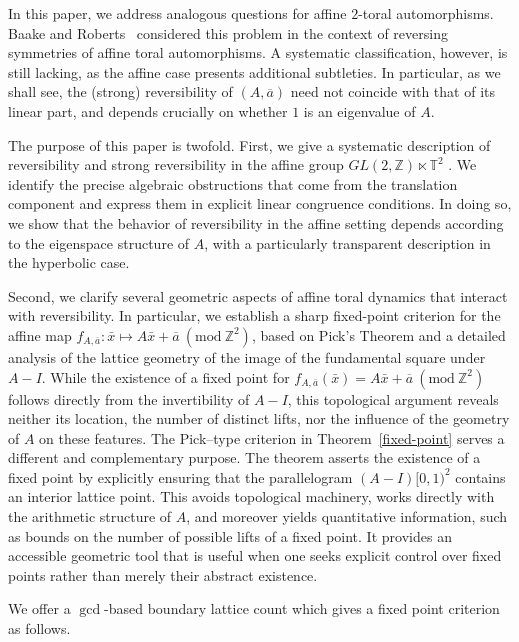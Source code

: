 \documentclass[12pt]{amsart}
\theoremstyle{plain}
\theoremstyle{definition}
\theoremstyle{remark}
\begin{document}
\medskip In this paper, we address analogous questions for affine $2$-toral automorphisms. Baake and Roberts~\cite{BR2} considered this problem in the context of reversing symmetries of affine toral automorphisms. A systematic classification, however, is still lacking, as the affine case presents additional subtleties. In particular, as we shall see, the (strong) reversibility of $(A,\overline{a})$ need not coincide with that of its linear part, and depends crucially on whether $1$ is an eigenvalue of $A$.

\medskip  The purpose of this paper is twofold.  First, we give a systematic description
of reversibility and strong reversibility in the affine group
$ GL(2,\mathbb Z)\ltimes\mathbb T^{2}$ .  We identify the precise algebraic
obstructions that come from the translation component and express them in explicit
linear congruence conditions.  In doing so, we show that the behavior of reversibility in the affine setting depends according to the eigenspace structure of $ A$, with a particularly transparent description in the hyperbolic case.

 Second, we clarify several geometric aspects of affine toral dynamics that
interact with reversibility.  In particular, we establish a sharp fixed-point
criterion for the affine map $f_{A,\overline{a}}: \bar{x}\mapsto A\bar{x}+\overline{a}~(\text{mod}~\mathbb{Z}^2)$, based on Pick's Theorem \cite{GP} and a
detailed analysis of the lattice geometry of the image of the fundamental square under $ A-I$.  While the existence of a fixed point for $f_{A,\overline{a}}(\bar{x})=A\bar{x}+\overline{a}~(\text{mod}~\mathbb{Z}^2)$ follows directly from the invertibility of $A-I$, this topological argument reveals neither its location, the number of distinct lifts, nor the influence of the geometry of $A$ on these features. The Pick--type criterion in Theorem~\ref{fixed-point} serves a different and complementary purpose. The theorem asserts the existence of a fixed point by explicitly ensuring that the parallelogram $(A-I)[0,1)^2$ contains an interior lattice point.  This avoids topological machinery, works directly with the arithmetic structure of $A$, and moreover yields quantitative information, such as bounds on the number of
possible lifts of a fixed point. It provides an accessible geometric tool that is useful when one seeks explicit control over fixed points rather than merely their abstract existence.

\medskip We offer a $\gcd$-based boundary lattice count which  gives a fixed point criterion as follows. 
\end{document}
